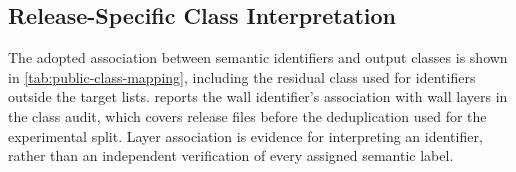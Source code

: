 \subsection{Release-Specific Class Interpretation}
\label{sec:public-class-interpretation}
The adopted association between semantic identifiers and output classes is shown
in \cref{tab:public-class-mapping}, including the residual class used for identifiers
outside the target lists.
 reports the wall identifier's association
with wall layers in the class audit, which covers release files before the
deduplication used for the experimental split.
Layer association is evidence for interpreting an identifier, rather than an
independent verification of every assigned semantic label.

\begin{table}[htbp]
  \centering
  \caption{Release-specific semantic identifier mapping used for the evaluated
  classes. Curtain wall remains outside the wall target under the current mapping.}
  \label{tab:public-class-mapping}
  
\end{table}

\begin{table}[htbp]
  \centering
  \caption{Wall-layer association reported by the class audit over release files.
  This is label-interpretation evidence, rather than classifier precision.}
  \label{tab:public-wall-layer-evidence}
  
\end{table}

